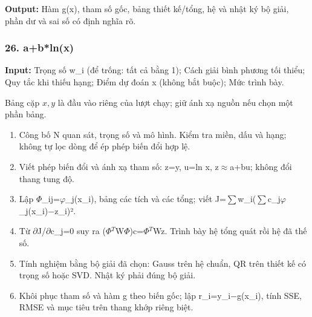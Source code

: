 \textbf{Output:} Hàm g(\allowbreak{}x),\allowbreak{} tham số gốc,\allowbreak{} bảng thiết kế/\allowbreak{}tổng,\allowbreak{} hệ và nhật ký bộ giải,\allowbreak{} phần dư và sai số có định nghĩa rõ.

\examplebreak\subsubsection*{26. a+\allowbreak{}b*ln(\allowbreak{}x)}

\textbf{Input:} Trọng số w\_i (\allowbreak{}để trống: tất cả bằng 1);\allowbreak{} Cách giải bình phương tối thiểu;\allowbreak{} Quy tắc khi thiếu hạng;\allowbreak{} Điểm dự đoán x (\allowbreak{}không bắt buộc);\allowbreak{} Mức trình bày.

Bảng cặp $x,y$ là đầu vào riêng của lượt chạy; giữ ánh xạ nguồn nếu chọn một phần bảng.

\begin{enumerate}

\item Công bố N quan sát,\allowbreak{} trọng số và mô hình. Kiểm tra miền,\allowbreak{} dấu và hạng;\allowbreak{} không tự lọc dòng để ép phép biến đổi hợp lệ.

\item Viết phép biến đổi và ánh xạ tham số: z=\allowbreak{}y,\allowbreak{} u=\allowbreak{}ln x,\allowbreak{} z\ensuremath{\approx}a+\allowbreak{}bu;\allowbreak{} không đổi thang tung độ.

\item Lập \ensuremath{\Phi}\_ij=\allowbreak{}\ensuremath{\varphi}\_j(\allowbreak{}x\_i),\allowbreak{} bảng các tích và các tổng;\allowbreak{} viết J=\allowbreak{}\ensuremath{\sum}w\_i(\allowbreak{}\ensuremath{\sum}c\_j\ensuremath{\varphi}\_j(\allowbreak{}x\_i)\ensuremath{-}z\_i)².

\item Từ \ensuremath{\partial}J/\allowbreak{}\ensuremath{\partial}c\_j=\allowbreak{}0 suy ra (\allowbreak{}\ensuremath{\Phi}\ensuremath{{}^T}W\ensuremath{\Phi})c=\allowbreak{}\ensuremath{\Phi}\ensuremath{{}^T}Wz. Trình bày hệ tổng quát rồi hệ đã thế số.

\item Tính nghiệm bằng bộ giải đã chọn: Gauss trên hệ chuẩn,\allowbreak{} QR trên thiết kế có trọng số hoặc SVD. Nhật ký phải đúng bộ giải.

\item Khôi phục tham số và hàm g theo biến gốc;\allowbreak{} lập r\_i=\allowbreak{}y\_i\ensuremath{-}g(\allowbreak{}x\_i),\allowbreak{} tính SSE,\allowbreak{} RMSE và mục tiêu trên thang khớp riêng biệt.

\end{enumerate}

